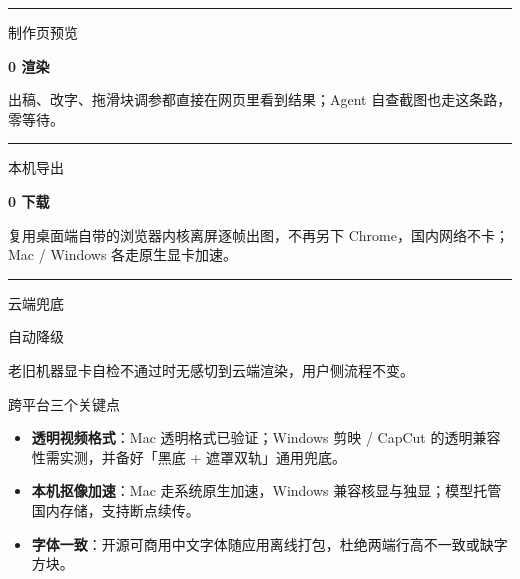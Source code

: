 \documentclass[10pt,a4paper,fontset=none]{ctexart}
\newcommand{\Thin}{\LatinThin\CJKthin}
\newcommand{\Med}{\LatinMed\CJKmed}
\newcommand{\Sub}[1]{%
  \par\vspace{0.85cm}
  {\fontsize{13.5}{17}\selectfont\Med\color{Ink}#1\par}
  \vspace{0.3cm}
}
\begin{document}
\vspace{0.95cm}
\noindent
\begin{minipage}[t]{0.3\linewidth}
  {\color{Ink}\rule{\linewidth}{0.7pt}}\par\vspace{0.25cm}
  {\fontsize{9}{11}\selectfont\color{Sub}制作页预览}\par\vspace{0.1cm}
  {\fontsize{24}{28}\selectfont\bfseries 0 渲染}\par\vspace{0.25cm}
  {\fontsize{9}{15}\selectfont 出稿、改字、拖滑块调参都直接在网页里看到结果；Agent 自查截图也走这条路，零等待。}
\end{minipage}\hfill
\begin{minipage}[t]{0.3\linewidth}
  {\color{Ink}\rule{\linewidth}{0.7pt}}\par\vspace{0.25cm}
  {\fontsize{9}{11}\selectfont\color{Sub}本机导出}\par\vspace{0.1cm}
  {\fontsize{24}{28}\selectfont\bfseries 0 下载}\par\vspace{0.25cm}
  {\fontsize{9}{15}\selectfont 复用桌面端自带的浏览器内核离屏逐帧出图，不再另下 Chrome，国内网络不卡；Mac / Windows 各走原生显卡加速。}
\end{minipage}\hfill
\begin{minipage}[t]{0.3\linewidth}
  {\color{Ink}\rule{\linewidth}{0.7pt}}\par\vspace{0.25cm}
  {\fontsize{9}{11}\selectfont\color{Sub}云端兜底}\par\vspace{0.1cm}
  {\fontsize{24}{28}\selectfont\Thin 自动降级}\par\vspace{0.25cm}
  {\fontsize{9}{15}\selectfont 老旧机器显卡自检不通过时无感切到云端渲染，用户侧流程不变。}
\end{minipage}

\Sub{跨平台三个关键点}
\begin{itemize}
  \item \textbf{透明视频格式}：Mac 透明格式已验证；Windows 剪映 / CapCut 的透明兼容性需实测，并备好「黑底 + 遮罩双轨」通用兜底。
  \item \textbf{本机抠像加速}：Mac 走系统原生加速，Windows 兼容核显与独显；模型托管国内存储，支持断点续传。
  \item \textbf{字体一致}：开源可商用中文字体随应用离线打包，杜绝两端行高不一致或缺字方块。
\end{itemize}
\end{document}
